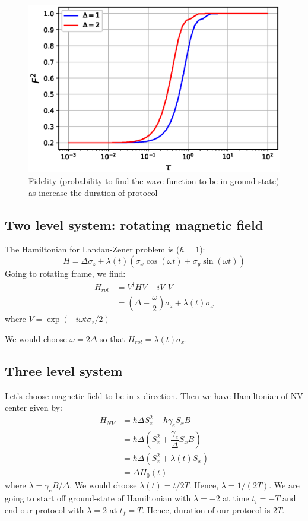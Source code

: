 \documentclass[11pt,a4paper]{article}
\begin{document}
\begin{figure}[!ht]
\begin{center}
\includegraphics[scale=0.5]{pics/fidelity_LZ.eps} 
\caption{Fidelity (probability to find the wave-function to be in ground state) as increase the duration of protocol}
\label{fid_nv}
\end{center}
\end{figure}


\subsection*{Two level system: rotating magnetic field}

The Hamiltonian for Landau-Zener problem is ($\hbar =1$):
\begin{equation}
H= \Delta \sigma_z + \lambda(t) (\sigma_x \cos(\omega t) + \sigma_y \sin(\omega t))
\end{equation}
Going to rotating frame, we find:
\begin{align*}
H_{rot}&= V^{\dagger}H V - i V^{\dagger} \dot{V}\\
&= (\Delta - \dfrac{\omega}{2}) \sigma_z + \lambda(t) \sigma_x
\end{align*}
where $V= \exp(-i \omega t \sigma_z/2)$

We would choose $\omega =2 \Delta$ so that $H_{rot}= \lambda(t) \sigma_x$.
  
\subsection*{Three level system}
Let's choose magnetic field to be in x-direction. Then we have Hamiltonian of NV center given by:
\begin{align*}
H_{NV} &= \hbar \Delta S_z^2 + \hbar \gamma_e   S_x  B \\
&= \hbar \Delta (S_z^2 +  \dfrac{\gamma_e}{\Delta}   S_x  B) \\
&= \hbar \Delta (S_z^2 +  \lambda(t) S_x  ) \\
&= \Delta H_0(t)
\end{align*}
where $\lambda= \gamma_e B/ \Delta $. We would choose $\lambda(t)= t/2T$. Hence, $\dot{\lambda}= 1/(2T)$. We are going to start off ground-state of Hamiltonian with $\lambda=-2$ at time $t_i= - T$ and end our protocol with  $\lambda=2$ at $t_f= T$. Hence, duration of our protocol is $2 T$. 
\end{document}
